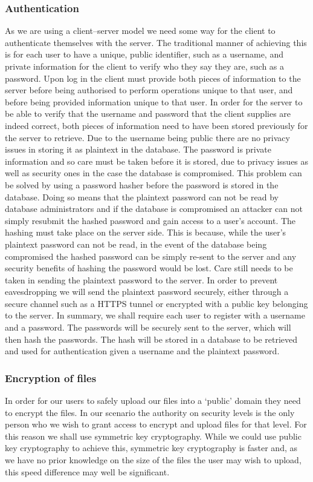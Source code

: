 \documentclass[12pt, titlepage]{article}
\begin{document}
\subsubsection{Authentication}
As we are using a client–server model we need some way for the client to authenticate themselves with the server. The traditional manner of achieving this is for each user to have a unique, public identifier, such as a username, and private information for the client to verify who they say they are, such as a password. Upon log in the client must provide both pieces of information to the server before being authorised to perform operations unique to that user, and before being provided information unique to that user.
\newline \indent In order for the server to be able to verify that the username and password that the client supplies are indeed correct, both pieces of information need to have been stored previously for the server to retrieve. Due to the username being public there are no privacy issues in storing it as plaintext in the database. The password is private information and so care must be taken before it is stored, due to privacy issues as well as security ones in the case the database is compromised. This problem can be solved by using a password hasher before the password is stored in the database. Doing so means that the plaintext password can not be read by database administrators and if the database is compromised an attacker can not simply resubmit the hashed password and gain access to a user's account. The hashing must take place on the server side. This is because, while the user's plaintext password can not be read, in the event of the database being compromised the hashed password can be simply re-sent to the server and any security benefits of hashing the password would be lost. Care still needs to be taken in sending the plaintext password to the server. In order to prevent eavesdropping we will send the plaintext password securely, either through a secure channel such as a HTTPS tunnel or encrypted with a public key belonging to the server.
\newline \indent In summary, we shall require each user to register with a username and a password. The passwords will be securely sent to the server, which will then hash the passwords. The hash will be stored in a database to be retrieved and used for authentication given a username and the plaintext password.

\subsubsection{Encryption of files}
In order for our users to safely upload our files into a `public' domain they need to encrypt the files. In our scenario the authority on security levels is the only person who we wish to grant access to encrypt and upload files for that level. For this reason we shall use symmetric key cryptography. While we could use public key cryptography to achieve this, symmetric key cryptography is faster and, as we have no prior knowledge on the size of the files the user may wish to upload, this speed difference may well be significant.
\end{document}
